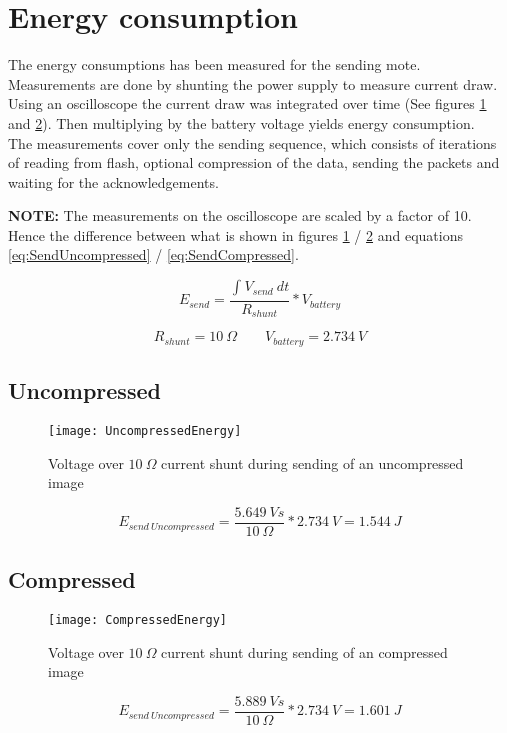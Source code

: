 \section{Energy consumption} 
\label{sec:energy_consumption}
The energy consumptions has been measured for the sending mote.
Measurements are done by shunting the power supply to measure current draw.
Using an oscilloscope the current draw was integrated over time (See figures \ref{fig:UncompressedSend} and \ref{fig:CompressedSend}).
Then multiplying by the battery voltage yields energy consumption. \\
The measurements cover only the sending sequence, which consists of iterations of reading from flash, optional compression of the data, sending the packets and waiting for the acknowledgements. 

\textbf{NOTE:} The measurements on the oscilloscope are scaled by a factor of 10.
Hence the difference between what is shown in figures \ref{fig:UncompressedSend} / \ref{fig:CompressedSend} and equations \ref{eq:SendUncompressed} / \ref{eq:SendCompressed}.

\begin{equation}
E_{send} = 
\dfrac{\int_{}^{}V_{send}\ dt}
{R_{shunt}}
* V_{battery}
\end{equation}

\begin{equation}
R_{shunt} = 10\ \Omega
\qquad
V_{battery} = 2.734\ V
\end{equation}


\subsection{Uncompressed}

\begin{figure}[H]
\centering
\texttt{[image: UncompressedEnergy]}
\caption{Voltage over $ 10\ \Omega $ current shunt during sending of an uncompressed image}
\label{fig:UncompressedSend}
\end{figure}

\begin{equation}
E_{send\ Uncompressed} = 
\dfrac{5.649\ Vs}
{10\ \Omega}
* 2.734\ V
=
1.544\ J
\label{eq:SendUncompressed}
\end{equation}

\subsection{Compressed}

\begin{figure}[H]
\centering
\texttt{[image: CompressedEnergy]}
\caption{Voltage over $ 10\ \Omega $ current shunt during sending of an compressed image}
\label{fig:CompressedSend}
\end{figure}

\begin{equation}
E_{send\ Uncompressed} = 
\dfrac{5.889\ Vs}
{10\ \Omega}
* 2.734\ V
=
1.601\ J
\label{eq:SendCompressed}
\end{equation}



